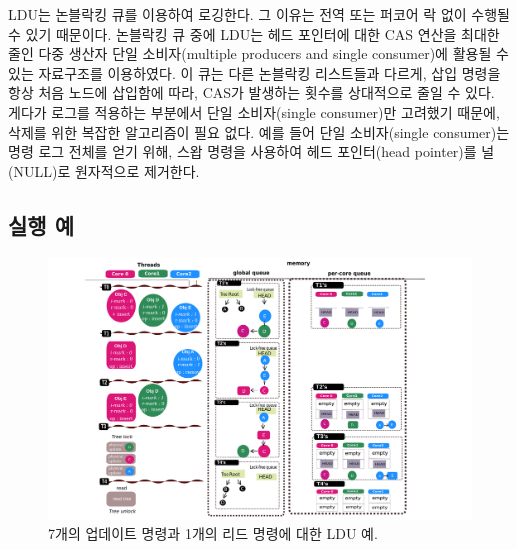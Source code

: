 LDU는  논블락킹 큐를 이용하여 로깅한다. 그 이유는 전역 또는 퍼코어 락 없이 수행될 수 
있기 때문이다. 
논블락킹 큐 중에 LDU는 헤드 포인터에 대한 CAS 연산을 최대한 줄인 다중 생산자 단일 소비자(multiple producers
and single consumer)에 활용될 수 있는 자료구조를 이용하였다.
이 큐는 다른 논블락킹 리스트들과 다르게, 삽입 명령을 항상 처음 노드에 삽입함에
따라, CAS가 발생하는 횟수를 상대적으로 줄일 수 있다.
게다가 로그를 적용하는 부분에서 단일 소비자(single consumer)만 고려했기 때문에, 
삭제를 위한 복잡한 알고리즘이 필요 없다. 
예를 들어 단일 소비자(single consumer)는 명령 로그 전체를 얻기 위해, 스왑 명령을 사용하여
 헤드 포인터(head pointer)를 널(NULL)로 원자적으로 제거한다. 


\subsection{실행 예}
\begin{figure}[h!]
  \begin{center}
     \includegraphics[width=1.0\textwidth,height=0.4\textheight]{fig/basic_gldu}
  \end{center}
  \caption{7개의 업데이트 명령과 1개의 리드 명령에 대한 LDU 예.}
  \label{fig:basic}
\end{figure}

